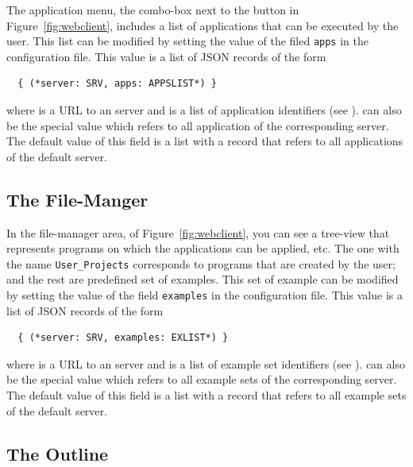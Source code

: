 The application menu, the combo-box next to the \applybutton button in
Figure~\ref{fig:webclient}, includes a list of applications that can
be executed by the user. This list can be modified by setting the
value of the filed \texttt{apps} in the configuration file. This value
is a list of JSON records of the form

\bigskip
\begin{lstlisting}
  { (*server: SRV, apps: APPSLIST*) }
\end{lstlisting}
 
\bigskip
\noindent  
where  is a URL to an \ei server and  is a list
of application identifiers (see ).
%
 can also be the special value  which refers
to all application of the corresponding server.
%
The default value of this field is a list with a record that refers to
all applications of the default server.

\subsection{The File-Manger}
\label{ch:clients:web:filemanager}

In the file-manager area, of Figure~\ref{fig:webclient}, you can see a
tree-view that represents programs on which the applications can be
applied, etc. The one with the name \texttt{User\_Projects}
corresponds to programs that are created by the user; and the rest are
predefined set of examples. This set of example can be modified by
setting the value of the field \texttt{examples} in the configuration
file.  This value is a list of JSON records of the form

\bigskip
\begin{lstlisting}
  { (*server: SRV, examples: EXLIST*) } 
\end{lstlisting}

\bigskip
\noindent
where  is a URL to an \ei server and  is a list
of example set identifiers (see
).  can also be the special
value  which refers to all example sets of the corresponding
server. The default value of this field is a list with a record that
refers to all example sets of the default server.

\subsection{The Outline}
\label{ch:clients:web:outline}

